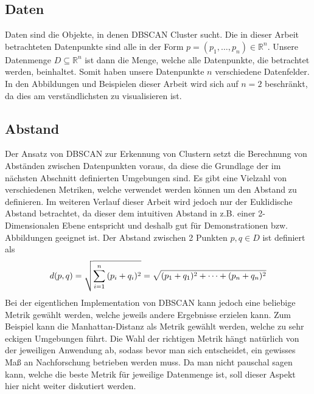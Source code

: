 \documentclass{lni}
\begin{document}

\subsection{Daten}
Daten sind die Objekte, in denen DBSCAN Cluster sucht. Die in dieser Arbeit betrachteten Datenpunkte sind alle in der Form $p = (p_1, \dots, p_n) \in \mathbb{R}^n$.
Unsere Datenmenge $D \subseteq \mathbb{R}^n$ ist dann die Menge, welche alle Datenpunkte, die betrachtet werden, beinhaltet. Somit haben unsere Datenpunkte $n$ verschiedene Datenfelder. In den Abbildungen und Beispielen dieser Arbeit wird sich auf $n=2$ beschränkt, da dies am verständlichsten zu visualisieren ist.


\subsection{Abstand}
\label{sec:abstand}
Der Ansatz von DBSCAN zur Erkennung von Clustern setzt die Berechnung von Abständen zwischen Datenpunkten voraus, da diese die Grundlage der im nächsten Abschnitt definierten Umgebungen sind. Es gibt eine Vielzahl von verschiedenen Metriken, welche verwendet werden können um den Abstand zu definieren. Im weiteren Verlauf dieser Arbeit wird jedoch nur der Euklidische Abstand betrachtet, da dieser dem intuitiven Abstand in z.B. einer 2-Dimensionalen Ebene entspricht und deshalb gut für Demonstrationen bzw. Abbildungen geeignet ist. Der Abstand zwischen 2 Punkten $p,q \in D$ ist definiert \cite{METRIC} als
\begin{align}
    d(p,q) = \sqrt{\sum_{i=1}^{n}{(p_i+q_i)^2}} = \sqrt{(p_1+q_1)^2 + \dots + (p_n+q_n)^2} \notag
\end{align}
Bei der eigentlichen Implementation von DBSCAN kann jedoch eine beliebige Metrik gewählt werden, welche jeweils andere Ergebnisse erzielen kann. Zum Beispiel kann die Manhattan-Distanz \cite{MANHATTAN} als Metrik gewählt werden, welche zu sehr eckigen Umgebungen führt. Die Wahl der richtigen Metrik hängt natürlich von der jeweiligen Anwendung ab, sodass bevor man sich entscheidet, ein gewisses Maß an Nachforschung betrieben werden muss. Da man nicht pauschal sagen kann, welche die beste Metrik für jeweilige Datenmenge ist, soll dieser Aspekt hier nicht weiter diskutiert werden.

\end{document}
